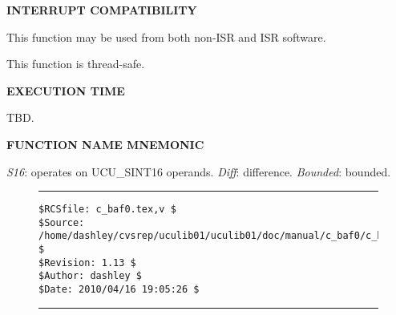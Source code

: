 \noindent\textbf{INTERRUPT COMPATIBILITY}
\begin{list}{}{\setlength{\leftmargin}{0.25in}\setlength{\topsep}{0.0in}}
\item This function may be used from both non-ISR and ISR software.
\item This function is thread-safe.
\end{list}
\vspace{2.8ex}

\noindent\textbf{EXECUTION TIME}
\begin{list}{}{\setlength{\leftmargin}{0.25in}\setlength{\topsep}{0.0in}}
\item TBD.
\end{list}
\vspace{2.8ex}

\noindent\textbf{FUNCTION NAME MNEMONIC}
\begin{list}{}{\setlength{\leftmargin}{0.25in}\setlength{\topsep}{0.0in}}
\item \emph{S16}:       operates on UCU\_SINT16 operands.
      \emph{Diff}:      difference.
      \emph{Bounded}:   bounded.
\end{list}


\noindent\begin{figure}[!b]
\noindent\rule[-0.25in]{\textwidth}{1pt}
\begin{tiny}
\begin{verbatim}
$RCSfile: c_baf0.tex,v $
$Source: /home/dashley/cvsrep/uculib01/uculib01/doc/manual/c_baf0/c_baf0.tex,v $
$Revision: 1.13 $
$Author: dashley $
$Date: 2010/04/16 19:05:26 $
\end{verbatim}
\end{tiny}
\noindent\rule[0.25in]{\textwidth}{1pt}
\end{figure}

%
%
%
%
%
%
%
%
%
%
%
%
%

